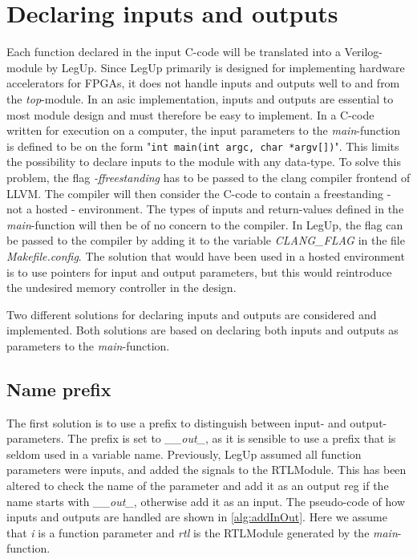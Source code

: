 \section{\label{subsec:inoutdecl}Declaring inputs and outputs}
Each function declared in the input C-code will be translated into a Verilog-module by LegUp. Since LegUp primarily is designed for implementing hardware accelerators for FPGAs, it does not handle inputs and outputs well to and from the \textit{top}-module. In an \gls{asic} implementation, inputs and outputs are essential to most module design and must therefore be easy to implement. In a C-code written for execution on a computer, the input parameters to the \textit{main}-function is defined to be on the form "\verb!int main(int argc, char *argv[])!". This limits the possibility to declare inputs to the module with any data-type. To solve this problem, the flag \textit{-ffreestanding} has to be passed to the clang compiler frontend of LLVM. The compiler will then consider the C-code to contain a freestanding - not a hosted - environment. The types of inputs and return-values defined in the \textit{main}-function will then be of no concern to the compiler. In LegUp, the flag can be passed to the compiler by adding it to the variable \textit{CLANG\_FLAG} in the file \textit{Makefile.config}. The solution that would have been used in a hosted environment is to use pointers for input and output parameters, but this would reintroduce the undesired memory controller in the design.

Two different solutions for declaring inputs and outputs are considered and implemented. Both solutions are based on declaring both inputs and outputs as parameters to the \textit{main}-function.
\subsection{\label{subsec:inoutprefix}Name prefix}
The first solution is to use a prefix to distinguish between input- and output-parameters. The prefix is set to \textit{\_\_out\_}, as it is sensible to use a prefix that is seldom used in a variable name. Previously, LegUp assumed all function parameters were inputs, and added the signals to the RTLModule. This has been altered to check the name of the parameter and add it as an output reg if the name starts with \textit{\_\_out\_}, otherwise add it as an input. The pseudo-code of how inputs and outputs are handled are shown in \cref{alg:addInOut}. Here we assume that \textit{i} is a function parameter and \textit{rtl} is the RTLModule generated by the \textit{main}-function.

